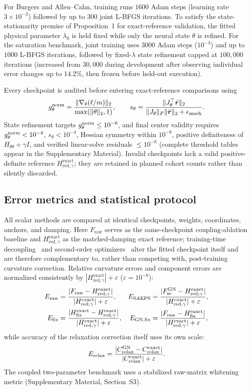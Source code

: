 \documentclass[preprint,11pt]{elsarticle}
\newcommand{\rbar}{\bar{\bm r}}
\newcommand{\Jt}{J_\theta}\newcommand{\Jl}{J_\lambda}
\newcommand{\Fraw}{F_{\mathrm{raw}}}
\newcommand{\Fse}{F_{\mathrm{se}}^{\mathrm{GN}}}
\newcommand{\Hred}{H_{\mathrm{red},\gamma}^{\mathrm{exact}}}
\newcommand{\Hfix}{H_{\mathrm{fix}}^{\mathrm{exact}}}
\newcommand{\Cexact}{C_{\mathrm{relax}}^{\mathrm{exact}}}
\newcommand{\Cgn}{C_{\mathrm{relax}}^{\mathrm{GN}}}
\newcommand{\Eraw}{E_{\mathrm{raw}}}\newcommand{\Esa}{E_{\mathrm{SAEPS}}}
\begin{document}
For Burgers and Allen--Cahn, training runs $1600$ Adam steps (learning rate $3\times10^{-3}$) followed by up to $300$ joint L-BFGS iterations.
To satisfy the state-stationarity premise of Proposition~1 for exact-reference validation, the fitted physical parameter $\lambda_0$ is held fixed while only the neural state $\theta$ is refined.
For the saturation benchmark, joint training uses $3000$ Adam steps ($10^{-3}$) and up to $1000$ L-BFGS iterations, followed by fixed-$\lambda$ state refinement capped at $100{,}000$ iterations (increased from $30{,}000$ during development after observing individual error changes up to $14.2\%$, then frozen before held-out execution).

Every checkpoint is audited before entering exact-reference comparisons using
\begin{equation}
 g_\theta^{\rm norm}=\frac{\|\nabla_\theta(\ell/m)\|_2}{\max(\|\theta\|_2,1)},\qquad
 s_\theta=\frac{\|\Jt^\top\rbar\|_2}{\|\Jt\|_F\|\rbar\|_2+\epsilon_{\rm mach}}.
 \label{eq:stationarity_definitions}
\end{equation}
State refinement targets $g_\theta^{\rm norm}\le 10^{-6}$, and final center validity requires $g_\theta^{\rm norm}<10^{-4}$, $s_\theta<10^{-4}$, Hessian symmetry within $10^{-8}$, positive definiteness of $H_{\theta\theta}+\gamma I$, and verified linear-solve residuals $\le 10^{-8}$ (complete threshold tables appear in the Supplementary Material).
Invalid checkpoints lack a valid positive-definite reference $\Hred$; they are retained in planned cohort counts rather than silently discarded.

\subsection{Error metrics and statistical protocol}
\label{sec:metrics}

All scalar methods are compared at identical checkpoints, weights, coordinates, anchors, and damping.
Here $\Fraw$ serves as the same-checkpoint coupling-ablation baseline and $\Hred$ as the matched-damping exact reference; training-time decoupling~\cite{uriarte2025least,zhang2026bilo} and second-order optimizers~\cite{muller2023engd} alter the fitted checkpoint itself and are therefore complementary to, rather than competing with, post-training curvature correction.
Relative curvature errors and component errors are normalized consistently by $|\Hred|+\varepsilon$ ($\varepsilon=10^{-8}$):
\begin{align}
 \Eraw&=\frac{|\Fraw-\Hred|}{|\Hred|+\varepsilon}, &
 \Esa&=\frac{|\Fse-\Hred|}{|\Hred|+\varepsilon}, \label{eq:scalar_errors}\\
 E_{\rm fix}&=\frac{|\Hfix-\Hred|}{|\Hred|+\varepsilon}, &
 E_{\rm GN,fix}&=\frac{|\Fraw-\Hfix|}{|\Hred|+\varepsilon}, \label{eq:fixed_state_exact_error}
\end{align}
while accuracy of the relaxation correction itself uses its own scale:
\begin{equation}
 E_{\rm relax}=\frac{|\Cgn-\Cexact|}{|\Cexact|+\varepsilon}.
 \label{eq:relaxation_error}
\end{equation}
The coupled two-parameter benchmark uses a stabilized raw-matrix whitening metric (Supplementary Material, Section~S3).
\end{document}
